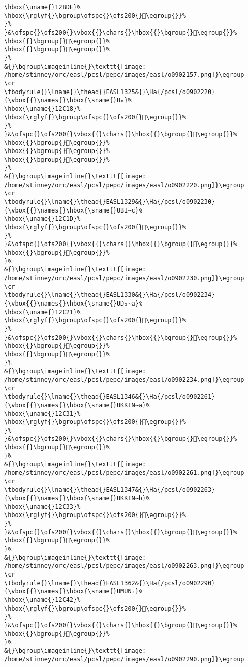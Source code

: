 \begin{verbatim}
\hbox{\uname{}12BDE}%
\hbox{\rglyf{}\bgroup\ofspc{}\ofs200{}𒯞\egroup{}}%
}%
}&\ofspc{}\ofs200{}\vbox{{}\chars{}\hbox{{}\bgroup{}𒯝\egroup{}}%
\hbox{{}\bgroup{}𒯞\egroup{}}%
\hbox{{}\bgroup{}𒯟\egroup{}}%
}%
&{}\bgroup\imageinline{}\texttt{[image: /home/stinney/orc/easl/pcsl/pepc/images/easl/o0902157.png]}\egroup
\cr
\tbodyrule{}\lname{}\thead{}EASL1325&{}\Ha{/pcsl/o0902220}{\vbox{{}\names{}\hbox{\sname{}U₈}%
\hbox{\uname{}12C18}%
\hbox{\rglyf{}\bgroup\ofspc{}\ofs200{}𒰘\egroup{}}%
}%
}&\ofspc{}\ofs200{}\vbox{{}\chars{}\hbox{{}\bgroup{}𒰖\egroup{}}%
\hbox{{}\bgroup{}𒰘\egroup{}}%
\hbox{{}\bgroup{}𒰙\egroup{}}%
\hbox{{}\bgroup{}𒰚\egroup{}}%
}%
&{}\bgroup\imageinline{}\texttt{[image: /home/stinney/orc/easl/pcsl/pepc/images/easl/o0902220.png]}\egroup
\cr
\tbodyrule{}\lname{}\thead{}EASL1329&{}\Ha{/pcsl/o0902230}{\vbox{{}\names{}\hbox{\sname{}UBI∼c}%
\hbox{\uname{}12C1D}%
\hbox{\rglyf{}\bgroup\ofspc{}\ofs200{}𒰝\egroup{}}%
}%
}&\ofspc{}\ofs200{}\vbox{{}\chars{}\hbox{{}\bgroup{}𒰝\egroup{}}%
\hbox{{}\bgroup{}𒰞\egroup{}}%
}%
&{}\bgroup\imageinline{}\texttt{[image: /home/stinney/orc/easl/pcsl/pepc/images/easl/o0902230.png]}\egroup
\cr
\tbodyrule{}\lname{}\thead{}EASL1330&{}\Ha{/pcsl/o0902234}{\vbox{{}\names{}\hbox{\sname{}UD₅∼a}%
\hbox{\uname{}12C21}%
\hbox{\rglyf{}\bgroup\ofspc{}\ofs200{}𒰡\egroup{}}%
}%
}&\ofspc{}\ofs200{}\vbox{{}\chars{}\hbox{{}\bgroup{}𒰟\egroup{}}%
\hbox{{}\bgroup{}𒰡\egroup{}}%
\hbox{{}\bgroup{}𒰢\egroup{}}%
}%
&{}\bgroup\imageinline{}\texttt{[image: /home/stinney/orc/easl/pcsl/pepc/images/easl/o0902234.png]}\egroup
\cr
\tbodyrule{}\lname{}\thead{}EASL1346&{}\Ha{/pcsl/o0902261}{\vbox{{}\names{}\hbox{\sname{}UKKIN∼a}%
\hbox{\uname{}12C31}%
\hbox{\rglyf{}\bgroup\ofspc{}\ofs200{}𒰱\egroup{}}%
}%
}&\ofspc{}\ofs200{}\vbox{{}\chars{}\hbox{{}\bgroup{}𒰲\egroup{}}%
\hbox{{}\bgroup{}𒰱\egroup{}}%
}%
&{}\bgroup\imageinline{}\texttt{[image: /home/stinney/orc/easl/pcsl/pepc/images/easl/o0902261.png]}\egroup
\cr
\tbodyrule{}\lname{}\thead{}EASL1347&{}\Ha{/pcsl/o0902263}{\vbox{{}\names{}\hbox{\sname{}UKKIN∼b}%
\hbox{\uname{}12C33}%
\hbox{\rglyf{}\bgroup\ofspc{}\ofs200{}𒰳\egroup{}}%
}%
}&\ofspc{}\ofs200{}\vbox{{}\chars{}\hbox{{}\bgroup{}𒰼\egroup{}}%
\hbox{{}\bgroup{}𒰳\egroup{}}%
}%
&{}\bgroup\imageinline{}\texttt{[image: /home/stinney/orc/easl/pcsl/pepc/images/easl/o0902263.png]}\egroup
\cr
\tbodyrule{}\lname{}\thead{}EASL1362&{}\Ha{/pcsl/o0902290}{\vbox{{}\names{}\hbox{\sname{}UMUN₂}%
\hbox{\uname{}12C42}%
\hbox{\rglyf{}\bgroup\ofspc{}\ofs200{}𒱂\egroup{}}%
}%
}&\ofspc{}\ofs200{}\vbox{{}\chars{}\hbox{{}\bgroup{}𒱃\egroup{}}%
\hbox{{}\bgroup{}𒱂\egroup{}}%
}%
&{}\bgroup\imageinline{}\texttt{[image: /home/stinney/orc/easl/pcsl/pepc/images/easl/o0902290.png]}\egroup

\end{verbatim}

